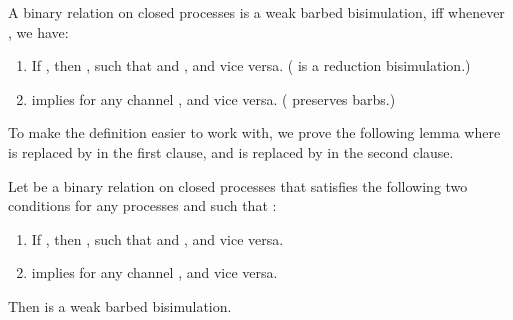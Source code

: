 \documentclass{LMCS}
\renewcommand{\_}{\mathord{\rule[-.25ex]{1ex}{.15ex}}}
\begin{document}
\begin{defi}
\label{def.joinpi.bisi}
  A binary relation  on closed processes is a weak barbed
  bisimulation, iff whenever , we have:
  \begin{enumerate}[(1)]
  \item If , then , such that  and , and vice versa. ( is a reduction
    bisimulation.)
  \item  implies  for any channel
    , and vice versa. ( preserves barbs.)
  \end{enumerate}
\end{defi}
To make the definition easier to work with, we prove the following
lemma where  is replaced by  in the
first clause, and  is replaced by  in
the second clause.
\begin{lem}\label{lemma.joinpi.bisi}
  Let  be a binary relation on closed processes that satisfies the
  following two conditions for any processes  and  such that
  :
  \begin{enumerate}[\em(1)]
  \item If , then , such that  and , and vice versa.
  \item  implies  for any channel ,
    and vice versa.
  \end{enumerate}
  Then  is a weak barbed bisimulation.
\end{lem}
\end{document}
